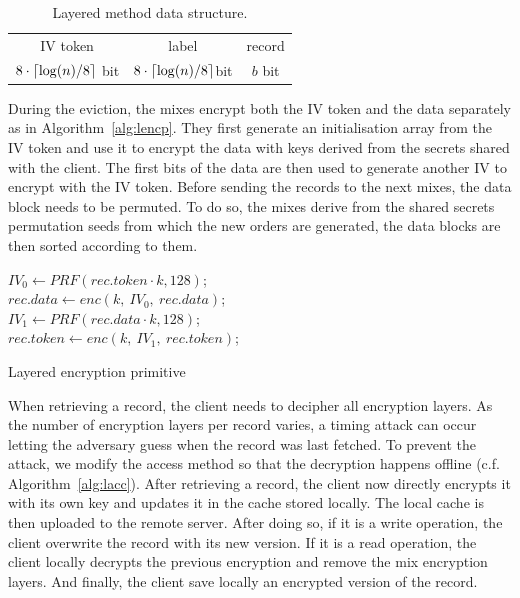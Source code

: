 \documentclass[USenglish,oneside,twocolumn]{article}
\DeclarePairedDelimiter{\ceil}{\lceil}{\rceil}
\begin{document}
\begin{table}[H]
\begin{minipage}[t][][b]{.475\textwidth}
\vspace{0pt}
\centering
\begin{tabular}{|c|c|c|}
IV token  &  label & record\\
$8\cdot\ceil{\log(n)/8}$ bit  &  $8\cdot\ceil{\log(n)/8}$bit &$b$ bit   \\
\end{tabular}
\centering
\caption{Layered method data structure.}
\label{ldata}
\end{minipage}
\end{table}

During the eviction, the mixes encrypt both the IV token and the data separately as in Algorithm~\ref{alg:lencp}. They first generate an initialisation array from the IV token and use it to encrypt the data with keys derived from the secrets shared with the client. The first bits of the data are then used to generate another IV to encrypt with the IV token. Before sending the records to the next mixes, the data block needs to be permuted. To do so, the mixes derive from the shared secrets permutation seeds from which the new orders are generated, the data blocks are then sorted according to them.\\

\begin{algorithm}
\DontPrintSemicolon
{}
$IV_0 \gets PRF(rec.token\cdot k, 128)$;\\
$rec.data \gets enc\left(k,\ IV_0,\ rec.data \right )$;\\
$IV_1 \gets PRF(rec.data \cdot k, 128)$;\\
$rec.token \gets enc\left(k,\ IV_1,\ rec.token \right )$;\\
\caption{Layered encryption primitive}
\label{alg:lencp}
\end{algorithm}

When retrieving a record, the client needs to decipher all encryption layers. As the number of encryption layers per record varies, a timing attack can occur letting the adversary guess when the record was last fetched. To prevent the attack, we modify the access method so that the decryption happens offline (c.f. Algorithm~\ref{alg:lacc}). After retrieving a record, the client now directly encrypts it with its own key and updates it in the cache stored locally. The local cache is then uploaded to the remote server.
After doing so, if it is a write operation, the client overwrite the record with its new version. If it is a read operation, the client locally decrypts the previous encryption and remove the mix encryption layers. And finally, the client save locally an encrypted version of the record.\\ 
\end{document}
